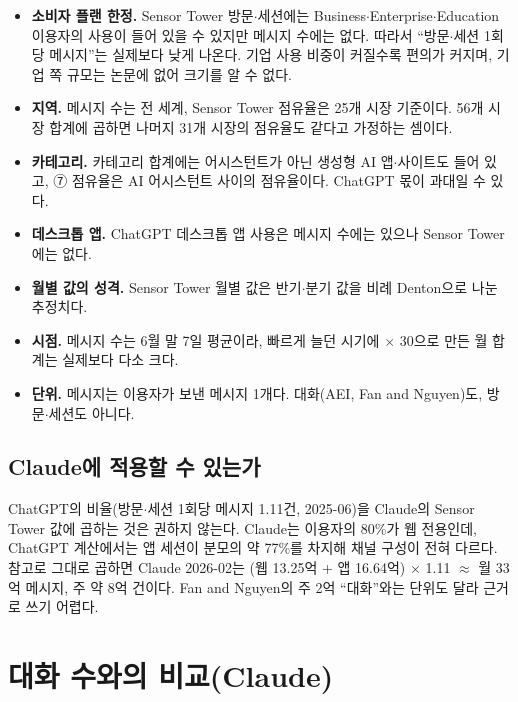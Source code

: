 \documentclass[11pt]{article}
\begin{document}
\begin{itemize}
  \item \textbf{소비자 플랜 한정.} Sensor Tower 방문$\cdot$세션에는 Business$\cdot$Enterprise$\cdot$Education 이용자의 사용이 들어 있을 수 있지만 메시지 수에는 없다. 따라서 ``방문$\cdot$세션 1회당 메시지''는 실제보다 낮게 나온다. 기업 사용 비중이 커질수록 편의가 커지며, 기업 쪽 규모는 논문에 없어 크기를 알 수 없다.
  \item \textbf{지역.} 메시지 수는 전 세계, Sensor Tower 점유율은 25개 시장 기준이다. 56개 시장 합계에 곱하면 나머지 31개 시장의 점유율도 같다고 가정하는 셈이다.
  \item \textbf{카테고리.} 카테고리 합계에는 어시스턴트가 아닌 생성형 AI 앱$\cdot$사이트도 들어 있고, ⑦ 점유율은 AI 어시스턴트 사이의 점유율이다. ChatGPT 몫이 과대일 수 있다.
  \item \textbf{데스크톱 앱.} ChatGPT 데스크톱 앱 사용은 메시지 수에는 있으나 Sensor Tower에는 없다.
  \item \textbf{월별 값의 성격.} Sensor Tower 월별 값은 반기$\cdot$분기 값을 비례 Denton으로 나눈 추정치다.
  \item \textbf{시점.} 메시지 수는 6월 말 7일 평균이라, 빠르게 늘던 시기에 $\times$ 30으로 만든 월 합계는 실제보다 다소 크다.
  \item \textbf{단위.} 메시지는 이용자가 보낸 메시지 1개다. 대화(AEI, Fan and Nguyen)도, 방문$\cdot$세션도 아니다.
\end{itemize}

\subsection{Claude에 적용할 수 있는가}

ChatGPT의 비율(방문$\cdot$세션 1회당 메시지 1.11건, 2025-06)을 Claude의 Sensor Tower 값에 곱하는 것은 권하지 않는다. Claude는 이용자의 80\%가 웹 전용인데, ChatGPT 계산에서는 앱 세션이 분모의 약 77\%를 차지해 채널 구성이 전혀 다르다. 참고로 그대로 곱하면 Claude 2026-02는 (웹 13.25억 + 앱 16.64억) $\times$ 1.11 $\approx$ 월 33억 메시지, 주 약 8억 건이다. Fan and Nguyen의 주 2억 ``대화''와는 단위도 달라 근거로 쓰기 어렵다.

\section{\citeauthor{fan-2026-aggregate-gains-from-ai} 대화 수와의 비교(Claude)}
\end{document}
